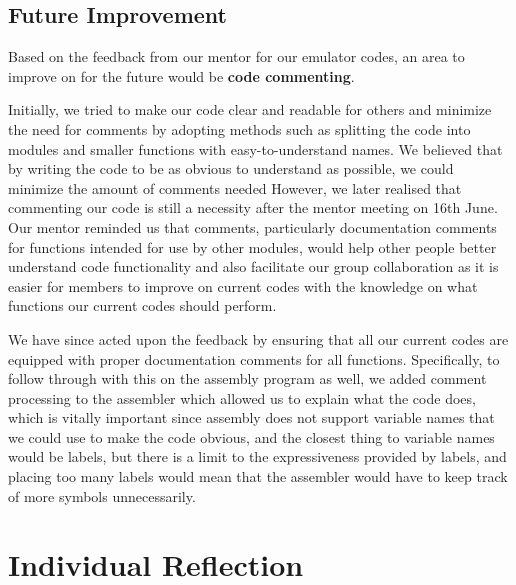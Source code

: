 \documentclass{article}
\begin{document}
\begin{adjustwidth}{2em}{0pt}
        
        \subsection{Future Improvement}
        
            Based on the feedback from our mentor for our emulator codes, an area to improve on for the future would be \textbf{code commenting}. 
            
            Initially, we tried to make our code clear and readable for others and minimize the need for comments by adopting methods such as splitting the code into modules and smaller functions with easy-to-understand names. We believed that by writing the code to be as obvious to understand as possible, we could minimize the amount of comments needed However, we later realised that commenting our code is still a necessity after the mentor meeting on 16th June. Our mentor reminded us that comments, particularly documentation comments for functions intended for use by other modules, would help other people better understand code functionality and also facilitate our group collaboration as it is easier for members to improve on current codes with the knowledge on what functions our current codes should perform. 
            
            We have since acted upon the feedback by ensuring that all our current codes are equipped with proper documentation comments for all functions. Specifically, to follow through with this on the assembly program as well, we added comment processing to the assembler which allowed us to explain what the code does, which is vitally important since assembly does not support variable names that we could use to make the code obvious, and the closest thing to variable names would be labels, but there is a limit to the expressiveness provided by labels, and placing too many labels would mean that the assembler would have to keep track of more symbols unnecessarily.
        
    \end{adjustwidth}

    \newpage
    
    \section{Individual Reflection}
    
\end{document}
